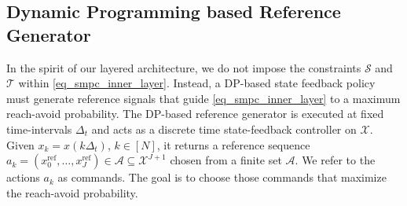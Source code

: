 \documentclass{IEEEtran}
\begin{document}


\subsection{Dynamic Programming based Reference Generator}
\label{sec_arch_outer}
In the spirit of our layered architecture, we do not impose the constraints $\mathcal{S}$ and $\mathcal{T}$ within \eqref{eq_smpc_inner_layer}. Instead, a DP-based state feedback policy must generate reference signals that guide \eqref{eq_smpc_inner_layer} to a maximum reach-avoid probability. The DP-based reference generator is executed at fixed time-intervals $\Delta_t$ and acts as a discrete time state-feedback controller on ${\mathcal{X}}$. Given $x_k={x}(k\Delta_t)$, $k\in[N]$, it returns a reference sequence $a_k=(x_{0}^{\text{ref}},\dots,x_{J}^{\text{ref}})\in\mathcal{A}\subseteq \mathcal{X}^{J+1}$ chosen from a finite set $\mathcal{A}$. We refer to the actions $a_k$ as commands. The goal is to choose those commands that maximize the reach-avoid probability. %
\end{document}
